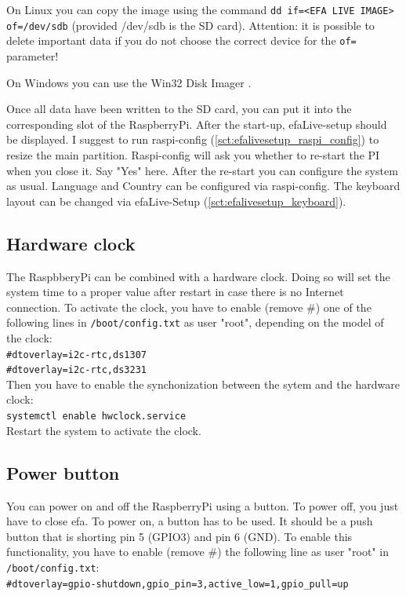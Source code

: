 \documentclass[a4paper,12pt,twoside]{article}
\begin{document}
On Linux you can copy the image using the command \texttt{dd
if={\textless}EFA LIVE IMAGE{\textgreater} of=/dev/sdb}
(provided /dev/sdb is the SD card). Attention: it is possible to
delete important data if you do not choose the correct device for the
\texttt{of=} parameter!

On Windows you can use the Win32 Disk Imager \cite{IMG1}.

Once all data have been written to the SD card, you can put it into the
corresponding slot of the RaspberryPi. After the start-up, efaLive-setup should be 
displayed. I suggest to run raspi-config (\ref{sct:efalivesetup_raspi_config}) to 
resize the main partition. Raspi-config 
will ask you whether to re-start the PI when you close it. Say "Yes" here. After the 
re-start you can configure the system as usual. Language and Country can be configured 
via raspi-config. The keyboard layout can be changed via efaLive-Setup (\ref{sct:efalivesetup_keyboard}).


\subsection{Hardware clock}
\label{sct:raspi_hardware_clock}
The RaspbberyPi can be combined with a hardware clock. Doing so will set the system time to a proper
value after restart in case there is no Internet connection. To activate the clock, you have to enable
(remove \#) one of the following lines in \texttt{/boot/config.txt} as user "root", depending on the
model of the clock:
\bigskip
\\
\texttt{\#dtoverlay=i2c-rtc,ds1307\\
\#dtoverlay=i2c-rtc,ds3231}
\bigskip
\\
Then you have to enable the synchonization between the sytem and the hardware clock:
\bigskip
\\
\texttt{systemctl enable hwclock.service}
\bigskip
\\
Restart the system to activate the clock.


\subsection{Power button}
\label{sct:raspi_power_button}
You can power on and off the RaspberryPi using a button. To power off, you just have to close efa. To power on, a
button has to be used. It should be a push button that is shorting pin 5 (GPIO3) and pin 6 (GND). To enable this
functionality, you have to enable (remove \#) the following line as user "root" in \texttt{/boot/config.txt}:
\bigskip
\\
\texttt{\#dtoverlay=gpio-shutdown,gpio\_pin=3,active\_low=1,gpio\_pull=up}
\end{document}
